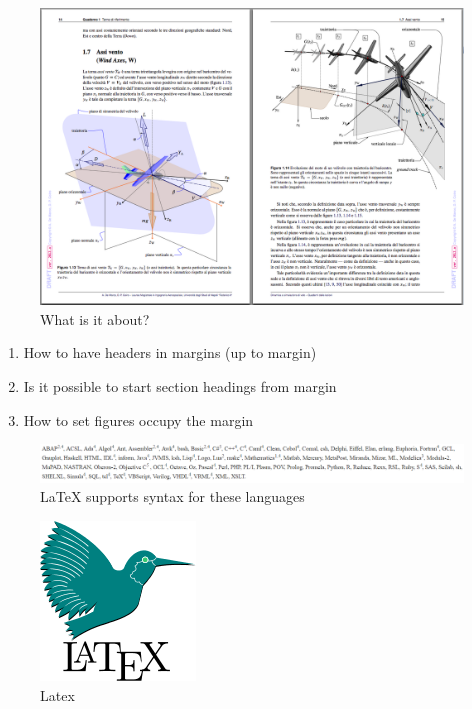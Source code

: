 \documentclass[a4paper]{article}
\begin{document}
\begin{figure}
  \includegraphics[width=\linewidth]{images/8IOMm.png} %
  \caption{What is it about?}
  \label{fig:airplane}
\end{figure}
\begin{enumerate}
 \item How to have headers in margins (up to margin)
 \item Is it possible to start section headings from margin
 \item How to set figures occupy the margin
\end{enumerate}

\begin{figure}
  \includegraphics[width=\linewidth]{images/latex-language.png}
  \caption{LaTeX supports syntax for these languages}
  \label{fig:latex}
\end{figure}

\begin{figure}[p!]
  \includegraphics[width=\linewidth]{images/latex.png}
  \caption{Latex}
  \label{fig:float-on an extra page}
\end{figure}
\end{document}

